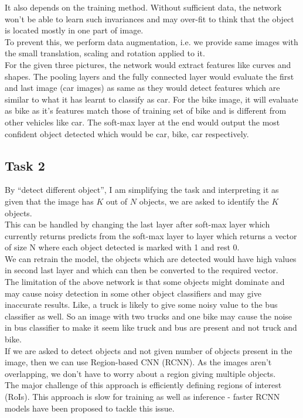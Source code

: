 \documentclass[12pt, fleqn]{article}
\begin{document}
It also depends on the training method. Without sufficient data, the network won't be able to learn such invariances and may over-fit to think that the object is located mostly in one part of image. \\
To prevent this, we perform data augmentation, i.e. we provide same images with the small translation, scaling and rotation applied to it. \\

For the given three pictures, the network would extract features like curves and shapes. The pooling layers and the fully connected layer would evaluate the first and last image (car images) as same as they would detect features which are similar to what it has learnt to classify as car. For the bike image, it will evaluate as bike as it's features match those of training set of bike and is different from other vehicles like car. The soft-max layer at the end would output the most confident object detected which would be car, bike, car respectively.

\newpage
\subsection{Task 2}
By ``detect different object'', I am simplifying the task and interpreting it as given that the image has $K$ out of $N$ objects, we are asked to identify the $K$ objects. \\
This can be handled by changing the last layer after soft-max layer which currently returns predicts from the soft-max layer to layer which returns a vector of size N where each object detected is marked with 1 and rest 0. \\
We can retrain the model, the objects which are detected would have high values in second last layer and which can then be converted to the required vector. \\
The limitation of the above network is that some objects might dominate and may cause noisy detection in some other object classifiers and may give inaccurate results. Like, a truck is likely to give some noisy value to the bus classifier as well. So an image with two trucks and one bike may cause the noise in bus classifier to make it seem like truck and bus are present and not truck and bike. \\

If we are asked to detect objects and not given number of objects present in the image, then we can use Region-based CNN (RCNN). As the images aren't overlapping, we don't have to worry about a region giving multiple objects. \\
The major challenge of this approach is efficiently defining regions of interest (RoIs). This approach is slow for training as well as inference - faster RCNN models have been proposed to tackle this issue. \\
\end{document}
